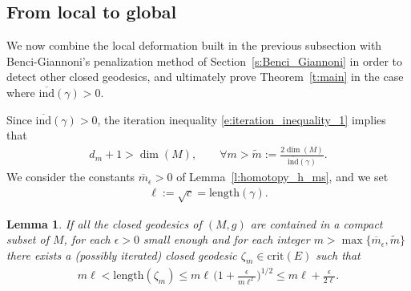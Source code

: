 \documentclass[reqno]{amsart}
\numberwithin{equation}{section}
\theoremstyle{personal}%
\newtheorem{lem}[thm]{Lemma}
\theoremstyle{definition}
\newcommand{\crit}{\mathrm{crit}}
\newcommand{\avind}{\overline{\ind}}
\newcommand{\ind}{\mathrm{ind}}
\begin{document}
\subsection{From local to global}\label{ss:local_to_global}
We now combine the local deformation built in the previous subsection with Benci-Giannoni's penalization method of Section~\ref{s:Benci_Giannoni} in order to detect other closed geodesics, and ultimately prove Theorem~\ref{t:main} in the case where $\avind(\gamma)>0$.



Since $\avind(\gamma)>0$, the iteration inequality \eqref{e:iteration_inequality_1} implies that 
\begin{align*}
d_m +1 > \dim(M),
\qquad
\forall m> \tilde m:=\frac{2\dim(M)}{\avind(\gamma)}.
\end{align*}
We consider the constants $\overline m_\epsilon>0$ of Lemma~\ref{l:homotopy_h_ms}, and we set
\begin{align*}
 \ell:=\sqrt c=\mathrm{length}(\gamma).
\end{align*}


\begin{lem}
\label{l:new_geodesics}
If all the closed geodesics of $(M,g)$ are contained in a compact subset of $M$, for each $\epsilon>0$ small enough and for each integer $m>  \max\{\overline m_\epsilon,\tilde m\}$ there exists a (possibly iterated) closed geodesic $\zeta_m\in\crit(E)$ such that
\begin{align}
\label{e:length_zeta_m}
m\ell < \mathrm{length}(\zeta_m) \leq m\ell\,\big(1+\tfrac{\epsilon}{m\ell^2}\big)^{1/2}\leq m\ell+\tfrac{\epsilon}{2\ell}.
\end{align}
\end{lem}
\end{document}
